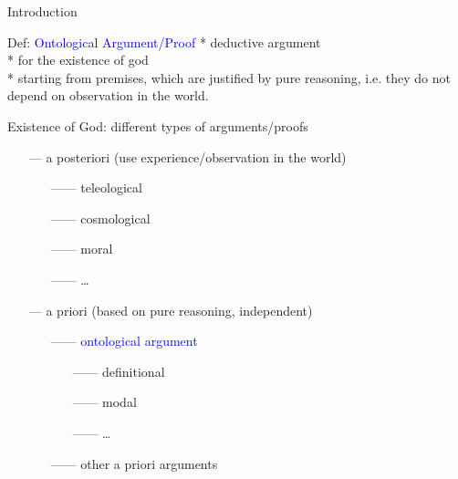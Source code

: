\begin{frame}{Introduction}\large
\begin{block}{Def: \textcolor{blue}{Ontological Argument/Proof}}
* deductive argument \\

* for the existence of god \\

* starting from premises, which are justified by pure reasoning,
i.e. they do not depend on observation in the world.
\end{block}

\vfill \pause
Existence of God: different types of arguments/proofs\\[.2em]
\begin{itemize}
\item[---]a posteriori (use experience/observation in the world)
  \begin{itemize}
  \item[------]teleological
  \item[------]cosmological
  \item[------]moral
  \item[------] \ldots
  \end{itemize}  
\item[---]a priori (based on pure reasoning, independent)
  \begin{itemize}
  \item[------]\textcolor{blue}{ontological argument}
    \begin{itemize}
    \item[------]definitional 
    \item[------]modal 
    \item[------] \ldots
    \end{itemize}
  \item[------]other a priori arguments
  \end{itemize}
\end{itemize}
\end{frame}


